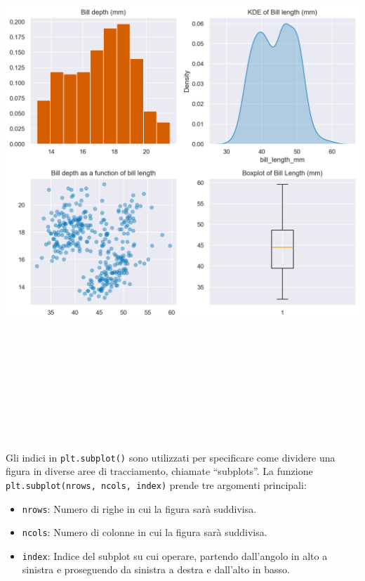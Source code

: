 \documentclass[
  letterpaper,
  krantz2]{{[}./krantz{]}}
\providecommand{\tightlist}{%
  \setlength{\itemsep}{0pt}\setlength{\parskip}{0pt}}\usepackage{longtable,booktabs,array}
\begin{document}
\includegraphics[width=9.19792in,height=8.15625in]{chapters/python/07_matplotlib_files/figure-pdf/cell-8-output-2.png}

Gli indici in \texttt{plt.subplot()} sono utilizzati per specificare
come dividere una figura in diverse aree di tracciamento, chiamate
``subplots''. La funzione \texttt{plt.subplot(nrows,\ ncols,\ index)}
prende tre argomenti principali:

\begin{itemize}
\tightlist
\item
  \texttt{nrows}: Numero di righe in cui la figura sarà suddivisa.
\item
  \texttt{ncols}: Numero di colonne in cui la figura sarà suddivisa.
\item
  \texttt{index}: Indice del subplot su cui operare, partendo
  dall'angolo in alto a sinistra e proseguendo da sinistra a destra e
  dall'alto in basso.
\end{itemize}
\end{document}
